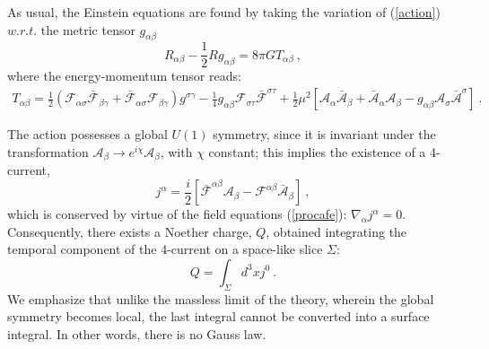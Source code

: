 \documentclass{article}
\numberwithin{equation}{section}
\begin{document}
As usual, the Einstein equations are found by taking the variation of
(\ref{action}) $w.r.t.$ the metric tensor $g_{\alpha \beta}$
\begin{equation}
R_{\alpha \beta}-\frac{1}{2}R g_{\alpha \beta}=8 \pi G T_{\alpha \beta} \ ,
\label{Einstein-eqs}
\end{equation}
where the energy-momentum tensor reads:
\begin{eqnarray}
T_{\alpha\beta}=\frac{1}{2}
( \mathcal{F}_{\alpha \sigma }\bar{\mathcal{F}}_{\beta \gamma}
+\bar{\mathcal{F}}_{\alpha \sigma } \mathcal{F}_{\beta \gamma}
)g^{\sigma \gamma}
-\frac{1}{4}g_{\alpha\beta}\mathcal{F}_{\sigma\tau}\bar{\mathcal{F}}^{\sigma\tau}+\frac{1}{2}\mu^2\left[  
\mathcal{A}_{\alpha}\bar{\mathcal{A}}_{\beta}
+\bar{\mathcal{A}}_{\alpha}\mathcal{A}_{\beta}
-g_{\alpha\beta} \mathcal{A}_\sigma\bar{\mathcal{A}}^\sigma\right]\ . \ \ \ \ \ \ \  \ 
\label{procaemt}
\end{eqnarray}

The action possesses a global $U(1)$ symmetry, since it is invariant under the transformation 
$\mathcal{A}_\beta\rightarrow e^{i\chi}\mathcal{A}_\beta$, with $\chi$ constant; 
this implies the existence of a  4-current, 
%
\begin{equation}
\label{j}
j^\alpha=\frac{i}{2}\left[\bar{\mathcal{F}}^{\alpha \beta}\mathcal{A}_\beta-\mathcal{F}^{\alpha\beta}\bar{\mathcal{A}}_\beta\right] \ ,
\end{equation}
which is conserved by virtue of the field equations (\ref{procafe}): $\nabla_\alpha j^\alpha=0$. Consequently, there exists a Noether charge, $Q$, obtained integrating the temporal component of the 4-current on a space-like slice $\Sigma$:
\begin{equation}
Q=\int_\Sigma d^3x j^0 \ .
\label{q}
\end{equation}
We emphasize that unlike the massless limit of the theory, wherein the global symmetry becomes local, the last integral cannot be converted into a surface integral. In other words, there is no Gauss law.


 
\end{document}
